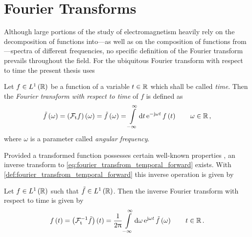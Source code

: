\section{Fourier Transforms}
\label{sec:fourier_transforms}

Although large portions of the study of electromagnetism heavily rely on the
decomposition of functions into---as well as on the composition of functions
from---spectra of different frequencies, no specific definition of the Fourier
transform prevails throughout the field.
For the ubiquitous Fourier transform with respect to time the present thesis
uses
\begin{definition}
	\label{def:fourier_transfrom_temporal_forward}
	Let $f \in L^1\left( \mathbb{R} \right)$ be a function of a variable $t \in \mathbb{R}$
	which shall be called \emph{time}.
	Then the \emph{Fourier transform with respect to time} of $f$ is defined as 
	\begin{equation}\label{eq:fourier_transfrom_temporal_forward}
		\tilde{f} \left(\omega\right) = 
		\left( \mathcal{F}_{\mathrm{t}} f \right) \left(\omega\right) = 
		\tilde{f} \left( \omega \right) =
		\int\limits_{-\infty}^{\infty} \mathrm{d} t \,
		\mathrm{e}^{-\mathrm{j} \omega t}\, 
		f\left( t \right)
		\qquad \omega \in \mathbb{R}
		\, ,
	\end{equation}
	where $\omega$ is a parameter called \emph{angular frequency}.
\end{definition}
Provided a transformed function possesses certain well-known properties
\cite{heuser2006, Strichartz2003}, an inverse transform to
\eqref{eq:fourier_transfrom_temporal_forward} exists.
With \cref{def:fourier_transfrom_temporal_forward}  this inverse operation is
given by
\begin{lemma}
	Let $f \in L^1 \left(\mathbb{R}\right)$ such that
	$\tilde{f} \in L^1 \left(\mathbb{R}\right)$. Then the
	inverse Fourier transform with respect to time is given by
	\begin{equation}\label{eq:fourier_transform_temporal_backward}
		f \left(t\right) =
		\left( \mathcal{F}_{\mathrm{t}}^{-1} \tilde{f} \right)
		\left( t \right) = 
		\frac{1}{2\uppi}
		\int\limits_{-\infty}^{\infty} \mathrm{d} \omega \,
		\mathrm{e}^{\mathrm{j} \omega t}\, 
		\tilde{f} \left( \omega \right)
		\qquad t \in \mathbb{R}
		\, .
	\end{equation}
\end{lemma}

